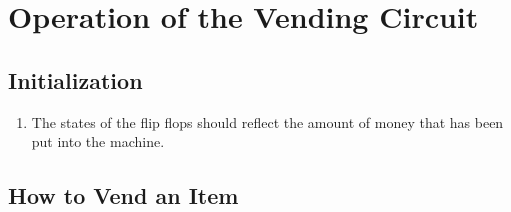 \section{Operation of the Vending Circuit}

\subsection{Initialization}
\begin{enumerate}
\item The states of the flip flops should reflect the amount of money that has been put into the machine.
\end{enumerate}

\subsection{How to Vend an Item}
